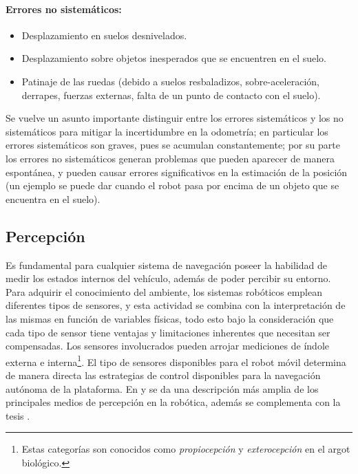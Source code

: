 \paragraph{Errores no sistemáticos:}
\begin{itemize}
	\item Desplazamiento en suelos desnivelados.
	\item Desplazamiento sobre objetos inesperados que se encuentren en el suelo.
	\item Patinaje de las ruedas (debido a suelos resbaladizos, sobre-aceleración, derrapes, fuerzas externas, falta de un punto de contacto con el suelo).
\end{itemize}
\par Se vuelve un asunto importante distinguir entre los errores sistemáticos y los no sistemáticos para mitigar la incertidumbre en la odometría; en particular los errores sistemáticos son graves, pues se acumulan constantemente; por su parte los errores no sistemáticos generan problemas que pueden aparecer de manera espontánea, y pueden causar errores significativos en la estimación de la posición (un ejemplo se puede dar cuando el robot pasa por encima de un objeto que se encuentra en el suelo).
\subsection{Percepción}
\label{ssec:per}
Es fundamental para cualquier sistema de navegación poseer la habilidad de medir los estados internos del vehículo, además de poder percibir su entorno. Para adquirir el conocimiento del ambiente, los sistemas robóticos emplean diferentes tipos de sensores, y esta actividad se combina con la interpretación de las mismas en función de variables físicas, todo esto bajo la consideración que cada tipo de sensor tiene ventajas y limitaciones inherentes que necesitan ser compensadas. Los sensores involucrados pueden arrojar mediciones de índole externa e interna\footnote{Estas categorías son conocidos como {\it propiocepción} y {\it exterocepción} en el argot biológico.}. El tipo de sensores disponibles para el robot móvil determina de manera directa las estrategias de control disponibles para la navegación autónoma de la plataforma. En \cite{siegwartIntroductionAutonomousMobile2011} y \cite{corellnikolausIntroductionAutonomousRobots2014} se da una descripción más amplia de los principales medios de percepción en la robótica, además se complementa con la tesis \cite{b.VisualHomingCarlike2005}. 
